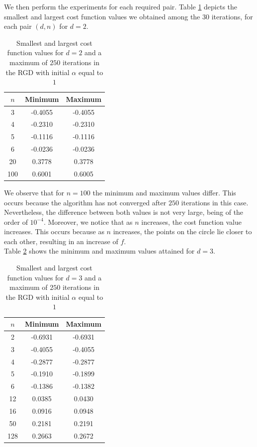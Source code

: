\documentclass{article}
\begin{document}
We then perform the experiments for each required pair. Table \ref{tab:d2} depicts the smallest and largest cost function values we obtained among the $30$ iterations, for each pair $(d, n)$ for $d=2$.
\begin{table}[H]
\centering
\begin{tabular}{|c|c|c|}
\hline
$n$ & Minimum & Maximum \\ \hline
3 & -0.4055 & -0.4055 \\
4 & -0.2310 & -0.2310 \\
5 & -0.1116 & -0.1116 \\
6 & -0.0236 & -0.0236 \\
20 & 0.3778 & 0.3778 \\
100 & 0.6001 & 0.6005 \\
\end{tabular}
\caption{Smallest and largest cost function values for $d=2$ and a maximum of $250$ iterations in the RGD with initial $\alpha$ equal to $1$}
\label{tab:d2}
\end{table}
We observe that for $n=100$ the minimum and maximum values differ. This occurs because the algorithm has not converged after $250$ iterations in this case. Nevertheless, the difference between both values is not very large, being of the order of $10^{-4}$. Moreover, we notice that as $n$ increases, the cost function value increases. This occurs because as $n$ increases, the points on the circle lie closer to each other, resulting in an increase of $f$.\\
Table \ref{tab:d3} shows the minimum and maximum values attained for $d=3$.
\begin{table}[H]
\centering
\begin{tabular}{|c|c|c|}
\hline
$n$ & Minimum & Maximum \\ \hline
2 & -0.6931 & -0.6931 \\
3 & -0.4055 & -0.4055 \\
4 & -0.2877 & -0.2877 \\
5 & -0.1910 & -0.1899 \\
6 & -0.1386 & -0.1382 \\
12 & 0.0385 & 0.0430 \\
16 & 0.0916 & 0.0948 \\
50 & 0.2181 & 0.2191 \\
128 & 0.2663 & 0.2672 \\
\end{tabular}
\caption{Smallest and largest cost function values for $d=3$ and a maximum of $250$ iterations in the RGD with initial $\alpha$ equal to $1$}
\label{tab:d3}
\end{table}
\end{document}
